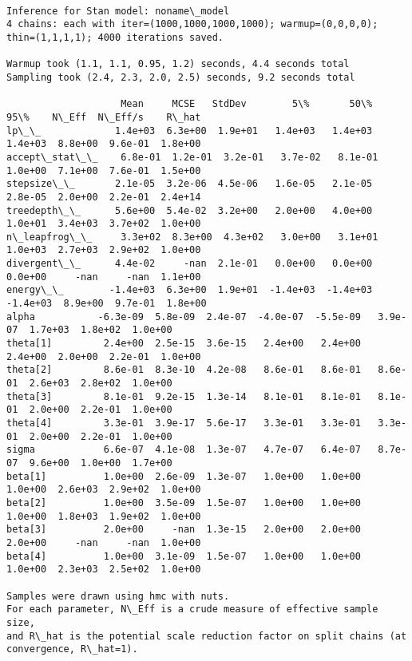 \documentclass[11pt]{article}
\begin{document}
    \begin{Verbatim}[commandchars=\\\{\}]

Inference for Stan model: noname\_model
4 chains: each with iter=(1000,1000,1000,1000); warmup=(0,0,0,0); thin=(1,1,1,1); 4000 iterations saved.

Warmup took (1.1, 1.1, 0.95, 1.2) seconds, 4.4 seconds total
Sampling took (2.4, 2.3, 2.0, 2.5) seconds, 9.2 seconds total

                    Mean     MCSE   StdDev        5\%       50\%       95\%    N\_Eff  N\_Eff/s    R\_hat
lp\_\_             1.4e+03  6.3e+00  1.9e+01   1.4e+03   1.4e+03   1.4e+03  8.8e+00  9.6e-01  1.8e+00
accept\_stat\_\_    6.8e-01  1.2e-01  3.2e-01   3.7e-02   8.1e-01   1.0e+00  7.1e+00  7.6e-01  1.5e+00
stepsize\_\_       2.1e-05  3.2e-06  4.5e-06   1.6e-05   2.1e-05   2.8e-05  2.0e+00  2.2e-01  2.4e+14
treedepth\_\_      5.6e+00  5.4e-02  3.2e+00   2.0e+00   4.0e+00   1.0e+01  3.4e+03  3.7e+02  1.0e+00
n\_leapfrog\_\_     3.3e+02  8.3e+00  4.3e+02   3.0e+00   3.1e+01   1.0e+03  2.7e+03  2.9e+02  1.0e+00
divergent\_\_      4.4e-02     -nan  2.1e-01   0.0e+00   0.0e+00   0.0e+00     -nan     -nan  1.1e+00
energy\_\_        -1.4e+03  6.3e+00  1.9e+01  -1.4e+03  -1.4e+03  -1.4e+03  8.9e+00  9.7e-01  1.8e+00
alpha           -6.3e-09  5.8e-09  2.4e-07  -4.0e-07  -5.5e-09   3.9e-07  1.7e+03  1.8e+02  1.0e+00
theta[1]         2.4e+00  2.5e-15  3.6e-15   2.4e+00   2.4e+00   2.4e+00  2.0e+00  2.2e-01  1.0e+00
theta[2]         8.6e-01  8.3e-10  4.2e-08   8.6e-01   8.6e-01   8.6e-01  2.6e+03  2.8e+02  1.0e+00
theta[3]         8.1e-01  9.2e-15  1.3e-14   8.1e-01   8.1e-01   8.1e-01  2.0e+00  2.2e-01  1.0e+00
theta[4]         3.3e-01  3.9e-17  5.6e-17   3.3e-01   3.3e-01   3.3e-01  2.0e+00  2.2e-01  1.0e+00
sigma            6.6e-07  4.1e-08  1.3e-07   4.7e-07   6.4e-07   8.7e-07  9.6e+00  1.0e+00  1.7e+00
beta[1]          1.0e+00  2.6e-09  1.3e-07   1.0e+00   1.0e+00   1.0e+00  2.6e+03  2.9e+02  1.0e+00
beta[2]          1.0e+00  3.5e-09  1.5e-07   1.0e+00   1.0e+00   1.0e+00  1.8e+03  1.9e+02  1.0e+00
beta[3]          2.0e+00     -nan  1.3e-15   2.0e+00   2.0e+00   2.0e+00     -nan     -nan  1.0e+00
beta[4]          1.0e+00  3.1e-09  1.5e-07   1.0e+00   1.0e+00   1.0e+00  2.3e+03  2.5e+02  1.0e+00

Samples were drawn using hmc with nuts.
For each parameter, N\_Eff is a crude measure of effective sample size,
and R\_hat is the potential scale reduction factor on split chains (at 
convergence, R\_hat=1).


    \end{Verbatim}
\end{document}
